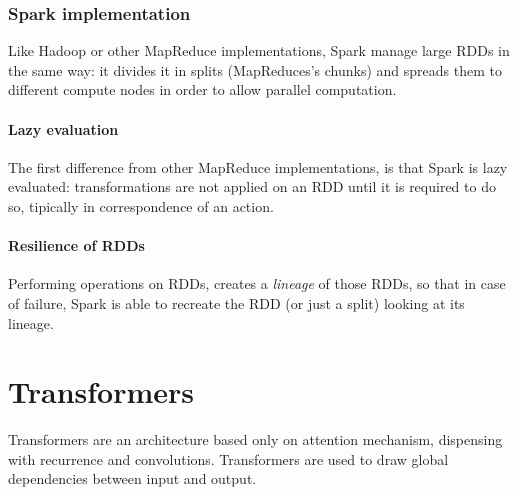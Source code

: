 \documentclass[\main/main.tex]{subfiles}
\begin{document}
\subsubsection{Spark implementation}
Like Hadoop or other MapReduce implementations, Spark manage large RDDs in the same way: it divides it in splits (MapReduces's chunks) and spreads them to different compute nodes in order to allow parallel computation.
\paragraph{Lazy evaluation}
The first difference from other MapReduce implementations, is that Spark is lazy evaluated: transformations are not applied on an RDD until it is required to do so, tipically in correspondence of an action.
\paragraph{Resilience of RDDs}
Performing operations on RDDs, creates a \emph{lineage} of those RDDs, so that in case of failure, Spark is able to recreate the RDD (or just a split) looking at its lineage.



\section{Transformers}
Transformers \allowbreak\cite{vaswani2017attention} are an architecture based only on attention mechanism, dispensing with recurrence and convolutions. Transformers are used to draw global dependencies between input and output.
\end{document}

